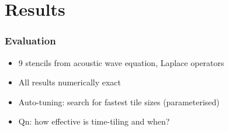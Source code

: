\documentclass{beamer}
\begin{document}
%



\section{Results}

\begin{frame}
\frametitle{Evaluation}

\begin{itemize}
	\item 9 stencils from acoustic wave equation, Laplace operators
	\item All results numerically exact
	\item Auto-tuning: search for fastest tile sizes (parameterised)
	\newline
	\item Qn: how effective is time-tiling and when?
\end{itemize}
\end{frame}
\end{document}
